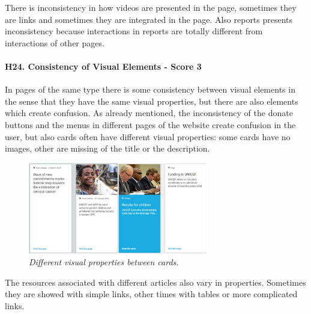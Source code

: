 \newline There is inconsistency in how videos are presented in the page, sometimes they are links and sometimes they are integrated in the page.
\newline Also reports presents inconsistency because interactions in reports are totally different from interactions of other pages.
\newline
\newline \paragraph{H24. Consistency of Visual Elements - Score 3}  \label{subsec:H24}	In pages of the same type there is some consistency between visual elements in the sense that they have the same visual properties, but there are also elements which create confusion.
\newline As already mentioned, the inconsistency of the donate buttons and the menus in different pages of the website create confusion in the user, but also cards often have different visual properties: some cards have no images, other are missing of the title or the description.
\begin{figure}[!h]
	\begin{center}
		\includegraphics[width=0.7\textwidth]{FinalScores28.jpg}
		\captionsetup{font=small}
		\caption{\textit{Different visual properties between cards.}}
	\end{center}
\end{figure}
\newline The resources associated with different articles also vary in properties. Sometimes they are showed with simple links, other times with tables or more complicated links.
